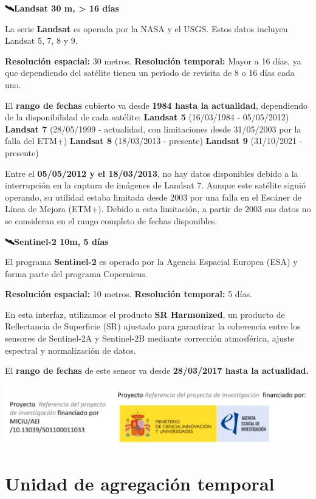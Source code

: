 \documentclass[
]{book}
\begin{document}
\textbf{🛰️Landsat 30 m, \textgreater{} 16 días}

La serie \textbf{Landsat} es operada por la NASA y el USGS. Estos datos incluyen Landsat 5, 7, 8 y 9.

\textbf{Resolución espacial:} 30 metros.
\textbf{Resolución temporal:} Mayor a 16 días, ya que dependiendo del satélite tienen un período de revisita de 8 o 16 días cada uno.

El \textbf{rango de fechas} cubierto va desde \textbf{1984 hasta la actualidad}, dependiendo de la disponibilidad de cada satélite:
\textbf{Landsat 5} (16/03/1984 - 05/05/2012)
\textbf{Landsat 7} (28/05/1999 - actualidad, con limitaciones desde 31/05/2003 por la falla del ETM+)
\textbf{Landsat 8} (18/03/2013 - presente)
\textbf{Landsat 9} (31/10/2021 - presente)

Entre el \textbf{05/05/2012 y el 18/03/2013}, no hay datos disponibles debido a la interrupción en la captura de imágenes de Landsat 7. Aunque este satélite siguió operando, su utilidad estaba limitada desde 2003 por una falla en el Escáner de Línea de Mejora (ETM+). Debido a esta limitación, a partir de 2003 sus datos no se consideran en el rango completo de fechas disponibles.

\textbf{🛰️Sentinel-2 10m, 5 días}

El programa \textbf{Sentinel-2} es operado por la Agencia Espacial Europea (ESA) y forma parte del programa Copernicus.

\textbf{Resolución espacial:} 10 metros.
\textbf{Resolución temporal:} 5 días.

En esta interfaz, utilizamos el producto \textbf{SR Harmonized}, un producto de Reflectancia de Superficie (SR) ajustado para garantizar la coherencia entre los sensores de Sentinel-2A y Sentinel-2B mediante corrección atmosférica, ajuste espectral y normalización de datos.

El \textbf{rango de fechas} de este sensor va desde \textbf{28/03/2017 hasta la actualidad.}

\includegraphics{assets/logo.jpeg}

\chapter{Unidad de agregación temporal}\label{ud-agregacion-temporal}
\end{document}
